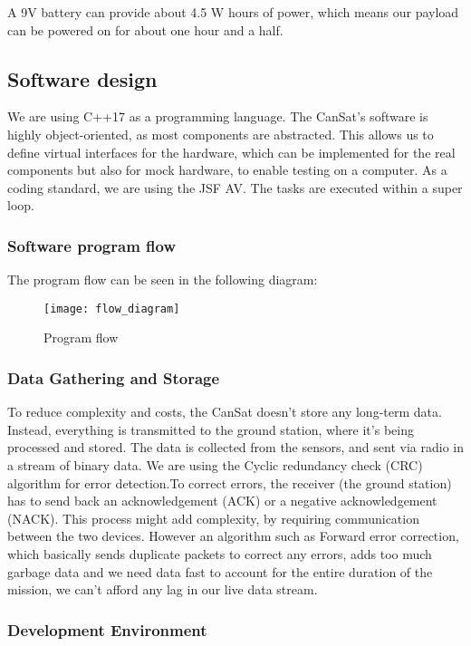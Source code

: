 A 9V battery can provide about 4.5 W hours of power, which means our payload can be powered on for about one hour and a half.

\subsection{Software design}

We are using C++17 as a programming language. The CanSat's software is highly object-oriented, as most components are abstracted. This allows us to define virtual interfaces for the hardware, which can be implemented for the real components but also for mock hardware, to enable testing on a computer. As a coding standard, we are using the JSF AV. The tasks are executed within a super loop.

\subsubsection{Software program flow}

The program flow can be seen in the following diagram:

\begin{figure}[H]
\centering
\texttt{[image: flow\_diagram]}
\caption{Program flow}
\end{figure}

\subsubsection{Data Gathering and Storage}

To reduce complexity and costs, the CanSat doesn't store any long-term data. Instead, everything is transmitted to the ground station, where it's being processed and stored. The data is collected from the sensors, and sent via radio in a stream of binary data. We are using the Cyclic redundancy check (CRC) algorithm for error detection.To correct errors, the receiver (the ground station) has to send back an acknowledgement (ACK) or a negative acknowledgement (NACK). This process might add complexity, by requiring communication between the two devices. However an algorithm such as Forward error correction, which basically sends duplicate packets to correct any errors, adds too much garbage data and we need data fast to account for the entire duration of the mission, we can't afford any lag in our live data stream.

\subsubsection{Development Environment}

